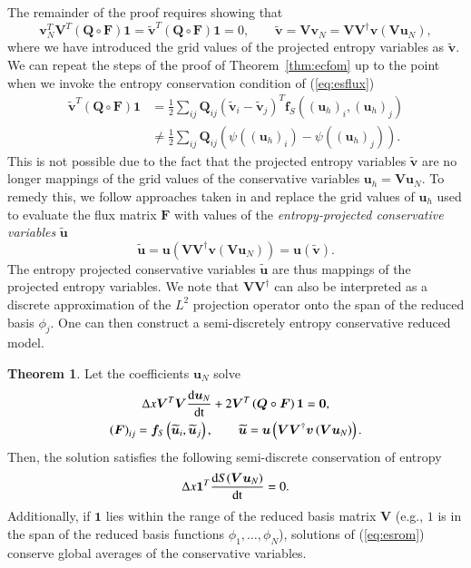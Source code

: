 \documentclass[preprint,10pt]{elsarticle}
\theoremstyle{definition}
\theoremstyle{lemma}
\theoremstyle{theorem}
\newtheorem{theorem}{Theorem}
\theoremstyle{assumption}
\renewcommand{\tilde}{\widetilde}
\newcommand{\td}[2]{\frac{{\rm d}#1}{{\rm d}{\rm #2}}}
\newcommand{\LRp}[1]{\left( #1 \right)}
\begin{document}
The remainder of the proof requires showing that 
\[
\bm{v}_N^T\bm{V}^T\LRp{\bm{Q}\circ \bm{F}}\bm{1} = \tilde{\bm{v}}^T\LRp{\bm{Q}\circ \bm{F}}\bm{1}  = 0, \qquad \tilde{\bm{v}} = \bm{V}\bm{v}_N = \bm{V}\bm{V}^{\dagger} \bm{v}\LRp{\bm{V}\bm{u}_N},
\]
where we have introduced the grid values of the projected entropy variables as $\tilde{\bm{v}}$.
We can repeat the steps of the proof of Theorem~\ref{thm:ecfom} up to the point when we invoke the entropy conservation condition of (\ref{eq:esflux})
\begin{align*}
\tilde{\bm{v}}^T\LRp{{\bm{Q}}\circ \bm{F}}\bm{1} &= \frac{1}{2}\sum_{ij} \bm{Q}_{ij} \LRp{\tilde{\bm{v}}_i-\tilde{\bm{v}}_j}^T \bm{f}_{S}\LRp{\LRp{\bm{u}_h}_i, \LRp{\bm{u}_h}_j}\\
&\neq \frac{1}{2}\sum_{ij} \bm{Q}_{ij} \LRp{ \psi((\bm{u}_h)_i)- \psi((\bm{u}_h)_j)}.
\end{align*}
This is not possible due to the fact that the projected entropy variables $\tilde{\bm{v}}$ are no longer mappings of the grid values of the conservative variables $\bm{u}_h = \bm{V}\bm{u}_N$.  To remedy this, we follow approaches taken in \cite{parsani2016entropy, chan2017discretely} and replace the grid values of ${\bm{u}_h}$ used to evaluate the flux matrix $\bm{F}$ with values of the \textit{entropy-projected conservative variables} $\tilde{\bm{u}}$
\[
\tilde{\bm{u}} = \bm{u}\LRp{\bm{V}\bm{V}^{\dagger}\bm{v}\LRp{\bm{V}\bm{u}_N}} = \bm{u}\LRp{\tilde{\bm{v}}}.
\]
The entropy projected conservative variables $\tilde{\bm{u}}$ are thus mappings of the projected entropy variables.  We note that $\bm{V}\bm{V}^{\dagger}$ can also be interpreted as a discrete approximation of the $L^2$ projection operator onto the span of the reduced basis $\phi_j$.  One can then construct a semi-discretely entropy conservative reduced model.  
\begin{theorem} 
Let the coefficients $\bm{u}_N$ solve
\begin{gather}
\Delta x\bm{V}^T\bm{V}\td{\bm{u}_N}{t} + 2\bm{V}^T\LRp{\bm{Q}\circ \bm{F}}\bm{1} = \bm{0}, \label{eq:esrom}\\
\LRp{\bm{F}}_{ij} = \bm{f}_S\LRp{\tilde{\bm{u}}_i,\tilde{\bm{u}}_j}, \qquad \tilde{\bm{u}} = \bm{u}\LRp{\bm{V}\bm{V}^{\dagger}\bm{v}\LRp{\bm{V}\bm{u}_N}}.\nonumber
\end{gather}
Then, the solution satisfies the following semi-discrete conservation of entropy
\[
\Delta x\bm{1}^T\td{S(\bm{V}\bm{u}_N)}{t} = 0.
\]
Additionally, if $\bm{1}$ lies within the range of the reduced basis matrix $\bm{V}$ (e.g., $1$ is in the span of the reduced basis functions $\phi_1, \ldots, \phi_N$), solutions of (\ref{eq:esrom}) conserve global averages of the conservative variables.
\label{thm:esrom}
\end{theorem}
\end{document}
